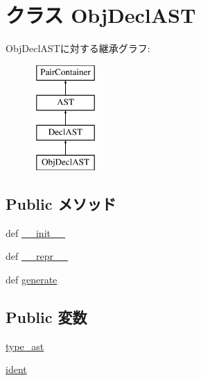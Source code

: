 \hypertarget{classslicc_1_1ast_1_1ObjDeclAST_1_1ObjDeclAST}{
\section{クラス ObjDeclAST}
\label{classslicc_1_1ast_1_1ObjDeclAST_1_1ObjDeclAST}
}
ObjDeclASTに対する継承グラフ:\begin{figure}[H]
\begin{center}
\leavevmode
\includegraphics[height=4cm]{classslicc_1_1ast_1_1ObjDeclAST_1_1ObjDeclAST}
\end{center}
\end{figure}
\subsection*{Public メソッド}
\begin{DoxyCompactItemize}
\item 
def \hyperlink{classslicc_1_1ast_1_1ObjDeclAST_1_1ObjDeclAST_ac775ee34451fdfa742b318538164070e}{\_\-\_\-init\_\-\_\-}
\item 
def \hyperlink{classslicc_1_1ast_1_1ObjDeclAST_1_1ObjDeclAST_ad8b9328939df072e4740cd9a63189744}{\_\-\_\-repr\_\-\_\-}
\item 
def \hyperlink{classslicc_1_1ast_1_1ObjDeclAST_1_1ObjDeclAST_a4555d1cee0dccf3942ea35fe86de2e8e}{generate}
\end{DoxyCompactItemize}
\subsection*{Public 変数}
\begin{DoxyCompactItemize}
\item 
\hyperlink{classslicc_1_1ast_1_1ObjDeclAST_1_1ObjDeclAST_a2c41e611550596541faa6f64ffecc139}{type\_\-ast}
\item 
\hyperlink{classslicc_1_1ast_1_1ObjDeclAST_1_1ObjDeclAST_a2fe57e2d3d2cba9a3aeba2f629eaa78b}{ident}
\end{DoxyCompactItemize}


